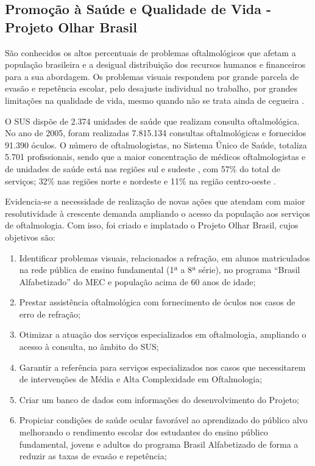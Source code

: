 \subsection[Promoção à Saúde e Qualidade de Vida - Projeto Olhar Brasil]{Promoção à Saúde e Qualidade de Vida - Projeto Olhar Brasil}

São conhecidos os altos percentuais de problemas oftalmológicos que afetam a população 
brasileira e a desigual distribuição dos recursos humanos e financeiros para a sua abordagem. Os 
problemas visuais respondem por grande parcela de evasão e repetência escolar, pelo desajuste 
individual no trabalho, por grandes limitações na qualidade de vida, mesmo quando não se trata 
ainda de cegueira \cite{olhar}.

O SUS dispõe de 2.374 unidades de saúde que realizam consulta oftalmológica. No ano 
de 2005, foram realizadas 7.815.134 consultas oftalmológicas e fornecidos 91.390 óculos. O 
número de oftalmologistas, no Sistema Único de Saúde, totaliza 5.701 profissionais, sendo que a 
maior concentração de médicos oftalmologistas e de unidades de saúde está nas regiões sul e 
sudeste
, com 57\% do total de serviços; 32\% nas regiões norte e nordeste e 11\% na região 
centro-oeste \cite{olhar}.

Evidencia-se a necessidade de realização de novas ações que atendam com maior 
resolutividade à crescente demanda ampliando o acesso da população aos serviços de 
oftalmologia. Com isso, foi criado e implatado o Projeto Olhar Brasil, cujos objetivos são:
\begin{enumerate}
\item Identificar problemas visuais, relacionados a refração, em alunos matriculados na rede 
pública de ensino fundamental (1ª a 8ª série), no programa “Brasil Alfabetizado” do MEC 
e população acima de 60 anos de idade; 
\item  Prestar assistência oftalmológica com fornecimento de óculos nos casos de erro de 
refração; 
\item Otimizar a atuação dos serviços especializados em oftalmologia, ampliando o acesso à
consulta, no âmbito do SUS; 
\item Garantir a referência para serviços especializados nos casos que necessitarem de 
intervenções de Média e Alta Complexidade em Oftalmologia; 
\item Criar um banco de dados com informações do desenvolvimento do Projeto; 
\item Propiciar condições de saúde ocular favorável ao aprendizado do público alvo 
melhorando o rendimento escolar dos estudantes do ensino público fundamental, jovens e 
adultos do programa Brasil Alfabetizado de forma a reduzir as taxas de evasão e 
repetência; 
 \end{enumerate}


